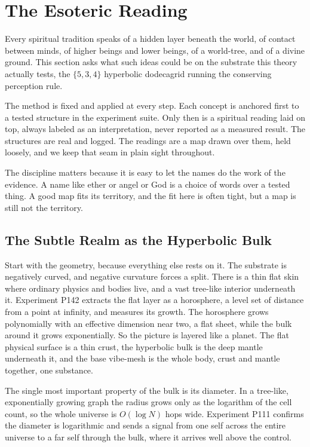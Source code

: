 \section{The Esoteric Reading}

Every spiritual tradition speaks of a hidden layer beneath the world, of contact between minds, of higher beings and lower beings, of a world-tree, and of a divine ground. This section asks what such ideas could be on the substrate this theory actually tests, the $\{5,3,4\}$ hyperbolic dodecagrid running the conserving perception rule.

The method is fixed and applied at every step. Each concept is anchored first to a tested structure in the experiment suite. Only then is a spiritual reading laid on top, always labeled as an interpretation, never reported as a measured result. The structures are real and logged. The readings are a map drawn over them, held loosely, and we keep that seam in plain sight throughout.

The discipline matters because it is easy to let the names do the work of the evidence. A name like ether or angel or God is a choice of words over a tested thing. A good map fits its territory, and the fit here is often tight, but a map is still not the territory.

\subsection{The Subtle Realm as the Hyperbolic Bulk}

Start with the geometry, because everything else rests on it. The substrate is negatively curved, and negative curvature forces a split. There is a thin flat skin where ordinary physics and bodies live, and a vast tree-like interior underneath it. Experiment P142 extracts the flat layer as a horosphere, a level set of distance from a point at infinity, and measures its growth. The horosphere grows polynomially with an effective dimension near two, a flat sheet, while the bulk around it grows exponentially. So the picture is layered like a planet. The flat physical surface is a thin crust, the hyperbolic bulk is the deep mantle underneath it, and the base vibe-mesh is the whole body, crust and mantle together, one substance.

The single most important property of the bulk is its diameter. In a tree-like, exponentially growing graph the radius grows only as the logarithm of the cell count, so the whole universe is $O(\log N)$ hops wide. Experiment P111 confirms the diameter is logarithmic and sends a signal from one self across the entire universe to a far self through the bulk, where it arrives well above the control.


